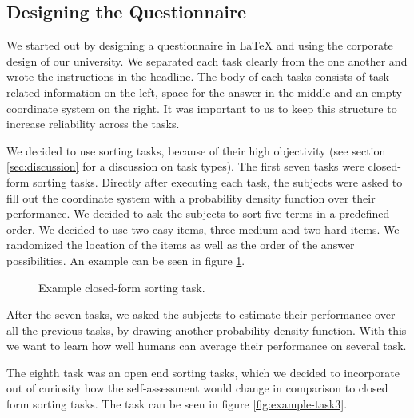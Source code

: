 \documentclass[../main/main.tex]{subfiles}
\begin{document}
	
	
	\subsection{Designing the Questionnaire}
	
	We started out by designing a questionnaire in LaTeX and using the corporate design of our university. We separated each task clearly from the one another and wrote the instructions in the headline. The body of each tasks consists of task related information on the left, space for the answer in the middle and an empty coordinate system on the right. It was important to us to keep this structure to increase reliability across the tasks.
	
	We decided to use sorting tasks, because of their high objectivity (see section \ref{sec:discussion} for a discussion on task types). The first seven tasks were closed-form sorting tasks. Directly after executing each task, the subjects were asked to fill out the coordinate system with a probability density function over their performance. We decided to ask the subjects to sort five terms in a predefined order. We decided to use two easy items, three medium and two hard items. We randomized the location of the items as well as the order of the answer possibilities. An example can be seen in figure \ref{fig:example-task}.
	
	\begin{figure}[h]
		\centering
		\captionsetup{justification=centering}
		\caption{Example closed-form sorting task.}
		\label{fig:example-task}
	\end{figure} 
	
	After the seven tasks, we asked the subjects to estimate their performance over all the previous tasks, by drawing another probability density function. With this we want to learn how well humans can average their performance on several task. 
		
	 The eighth task was an open end sorting tasks, which we decided to incorporate out of curiosity how the self-assessment would change in comparison to closed form sorting tasks. The task can be seen in figure \ref{fig:example-task3}.
	 
\end{document}

